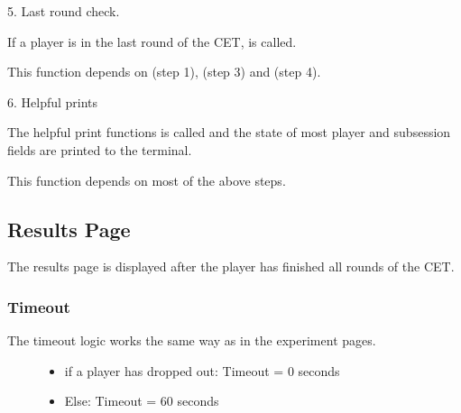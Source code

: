 \documentclass[letterpaper,10pt,english]{sphinxmanual}
\begin{document}
\begin{description}
\begin{DUlineblock}{0em}
\begin{DUlineblock}{\DUlineblockindent}
\end{DUlineblock}
\item[] 5. Last round check.
\item[]
\begin{DUlineblock}{\DUlineblockindent}
\item[] \sphinxhyphen{} If a player is in the last round of the CET,  is called.
\item[] \sphinxhyphen{} This function depends on  (step 1),  (step 3) and  (step 4).
\end{DUlineblock}
\item[] 6. Helpful prints
\item[]
\begin{DUlineblock}{\DUlineblockindent}
\item[] \sphinxhyphen{} The helpful print functions is called and the state of most player and subsession fields are printed to the terminal.
\item[] \sphinxhyphen{} This function depends on most of the above steps.
\end{DUlineblock}
\end{DUlineblock}

\end{description}


\subsection{Results Page}
\label{\detokenize{pages:results-page}}\label{\detokenize{pages:results}}
The results page is displayed after the player has finished all rounds of the CET.


\subsubsection{Timeout}
\label{\detokenize{pages:id5}}\begin{description}
\item[{The timeout logic works the same way as in the experiment pages.}] \leavevmode\begin{itemize}
\item {} 
if a player has dropped out: Timeout = 0 seconds

\item {} 
Else: Timeout = 60 seconds

\end{itemize}

\end{description}
\end{document}
